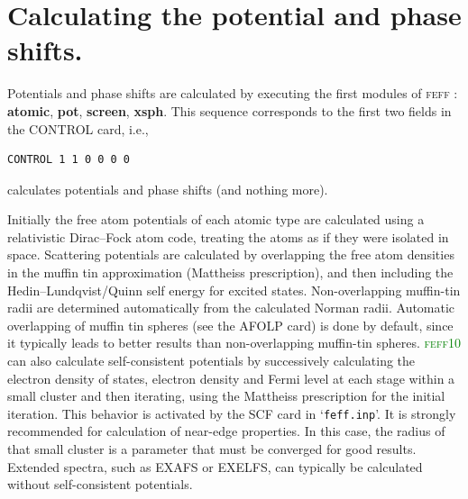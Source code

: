 \documentclass[11pt,oneside]{report} %
\newcommand{\feffcurrent}{\textsc{feff10}}
\newcommand{\program}[1]{\textsc{#1}}
\newcommand{\feff}{\program{feff}}
\newcommand{\file}[1]{`\texttt{#1}'}
\newcommand{\module}[1]{\textrm{\bf{#1}}}
\begin{document}
%


\section{Calculating the potential and phase shifts.}
\label{sec:calcpots}
Potentials and phase shifts are calculated by executing the first modules of
{\feff} : \module{atomic}, \module{pot}, \module{screen}, \module{xsph}.  This
sequence corresponds to the first two fields in the CONTROL card, i.e.,
\begin{verbatim}
CONTROL 1 1 0 0 0 0 
\end{verbatim}
calculates potentials and phase shifts (and nothing more).  

Initially the free atom potentials of each atomic type are calculated
using a relativistic Dirac--Fock atom code, treating the atoms as if
they were isolated in space. Scattering potentials are
calculated by overlapping the free atom densities in the muffin tin
approximation (Mattheiss prescription), and then including the
Hedin--Lundqvist/Quinn self energy for excited states. 
Non-overlapping muffin-tin radii are determined automatically from
the calculated Norman radii. Automatic overlapping of muffin tin
spheres (see the AFOLP card) is done by default, since it typically
leads to better results than non-overlapping muffin-tin spheres.
\textcolor{green}{\feffcurrent} can also calculate self-consistent potentials by successively
calculating the electron density of states, electron density and Fermi
level at each stage within a small cluster and then iterating, using
the Mattheiss prescription for the initial iteration.  This behavior is activated by the SCF card in \file{feff.inp}.  
It is strongly recommended for calculation of near-edge properties.  In this case, the radius
of that small cluster is a parameter that must be converged for good results.  Extended spectra, such as EXAFS or EXELFS,
can typically be calculated without self-consistent potentials.
\end{document}
